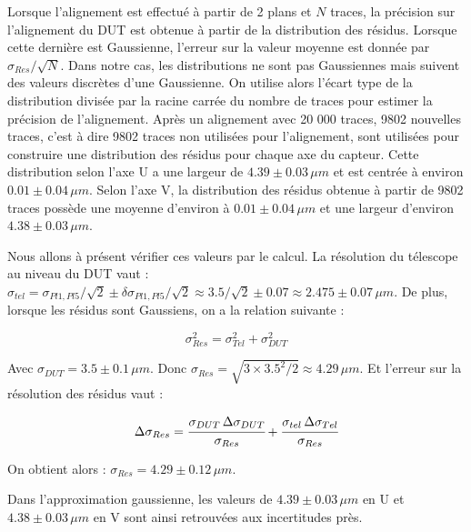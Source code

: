    \medskip
   
   Lorsque l'alignement est effectu\'e \`a partir de 2 plans et $N$ traces, la pr\'ecision sur l'alignement du DUT est obtenue \`a partir de la distribution des r\'esidus. Lorsque cette derni\`ere est Gaussienne, l'erreur sur la valeur moyenne est donn\'ee par $\sigma_{Res}/\sqrt{N}$. Dans notre cas, les distributions ne sont pas Gaussiennes mais suivent des valeurs discr\`etes d'une Gaussienne. On utilise alors l'\'ecart type de la distribution divis\'ee par la racine carr\'ee du nombre de traces pour estimer la pr\'ecision de l'alignement. Apr\`es un alignement avec 20 000 traces, 9802 nouvelles traces, c'est \`a dire 9802 traces non utilis\'ees pour l'alignement, sont utilis\'ees pour construire une distribution des r\'esidus pour chaque axe du capteur. Cette distribution selon l'axe U a une largeur de $4.39 \pm 0.03 \, \mu m$ et est centr\'ee \`a environ $0.01 \pm 0.04 \, \mu m$. Selon l'axe V, la distribution des r\'esidus obtenue \`a partir de 9802 traces poss\`ede une moyenne d'environ \`a $0.01 \pm 0.04 \, \mu m$ et une largeur d'environ $4.38 \pm 0.03 \, \mu m$.
   
   \medskip
   
   Nous allons \`a pr\'esent v\'erifier ces valeurs par le calcul. La r\'esolution du t\'elescope au niveau du DUT vaut : $\sigma_{tel} = \sigma_{Pl1,Pl5} / \sqrt{2} \pm \delta \sigma_{Pl1,Pl5}/\sqrt{2} \approx 3.5/\sqrt{2} \pm 0.07 \approx 2.475 \pm 0.07 \, \mu m$. De plus, lorsque les r\'esidus sont Gaussiens, on a la relation suivante :
   
   \begin{equation}
    \sigma_{Res}^2 = \sigma_{Tel}^2 + \sigma_{DUT}^2
   \end{equation}
   
   Avec $\sigma_{DUT} = 3.5 \pm 0.1 \, \mu m$. Donc $\sigma_{Res} = \sqrt{3 \times 3.5^2/2} \approx 4.29 \, \mu m$. Et l'erreur sur la r\'esolution des r\'esidus vaut : 
   
   \begin{equation}
    \Delta \sigma_{Res} = \cfrac{\sigma_{DUT} \, \Delta \sigma_{DUT}}{\sigma_{Res}} + \cfrac{\sigma_{tel} \, \Delta \sigma_{Tel}}{\sigma_{Res}}
   \end{equation}

   On obtient alors : $\sigma_{Res} = 4.29 \pm 0.12 \, \mu m$.
   
   \medskip
   
   Dans l'approximation gaussienne, les valeurs de $4.39 \pm 0.03 \, \mu m$ en U et $4.38 \pm 0.03 \, \mu m$ en V sont ainsi retrouv\'ees aux incertitudes pr\`es.
   
